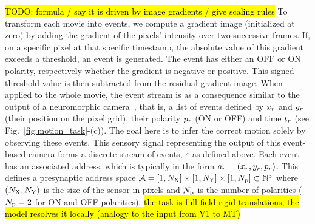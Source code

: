 \documentclass[default]{sn-jnl}%
\theoremstyle{thmstyleone}%
\theoremstyle{thmstyletwo}%
\theoremstyle{thmstylethree}%
\newcommand{\seeFig}[1]{see Fig.~\ref{fig:#1}}%
\newcommand{\note}[1]{{\sethlcolor{yellow}\hl{#1}}}
\begin{document}
\note{ TODO: formula / say it is driven by image gradients / give scaling rules }
To transform each movie into events, we compute a gradient image (initialized at zero) by adding the gradient of the pixels' intensity over two successive frames. If, on a specific pixel at that specific timestamp, the absolute value of this gradient exceeds a threshold, an event is generated. The event has either an OFF or ON polarity, respectively whether the gradient is negative or positive. This signed threshold value is then subtracted from the residual gradient image. When applied to the whole movie, the event stream is as a consequence similar to the output of a neuromorphic camera~\citep{rasetto_challenges_2022}, that is, a list of events defined by $x_r$ and $y_r$ (their position on the pixel grid), their polarity $p_r$ (ON or OFF) and time $t_r$  (\seeFig{motion_task}-(c)). The goal here is to infer the correct motion solely by observing these events. 
This sensory signal representing the output of this event-based camera forms a discrete stream of events, $\epsilon$ as defined above.   
Each event has an associated address, which is typically in the form $a_r=(x_r, y_r, p_r)$. This defines a presynaptic address space $\mathcal{A} = [1, N_\text{X}]\times[1, N_\text{Y}] \times [1, N_\text{p}] \subset \mathbb{N}^3$ where $(N_\text{X}, N_\text{Y})$ is the size of the sensor in pixels and $N_\text{p}$ is the number of polarities  ($N_\text{p}=2$ for ON and OFF polarities). 
\note{ the task is full-field rigid translations, the model resolves it locally (analogy to the input from V1 to MT) }
%
\end{document}
